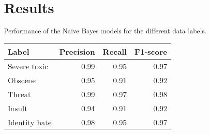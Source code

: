 \chapter{Results}

\begin{center}
  \caption{Performance of the Naive Bayes models for the different data labels. }
  \label{tbl:nb-performance}
  \begin{tabular}{l|rrr}
    Label & Precision & Recall & F1-score\\
    \hline
    Severe toxic & 0.99 & 0.95 & 0.97\\
    Obscene & 0.95 & 0.91 & 0.92\\
    Threat & 0.99 & 0.97 & 0.98\\
    Insult & 0.94 & 0.91 & 0.92\\
    Identity hate & 0.98 & 0.95 & 0.97\\
  \end{tabular}
\end{center}
